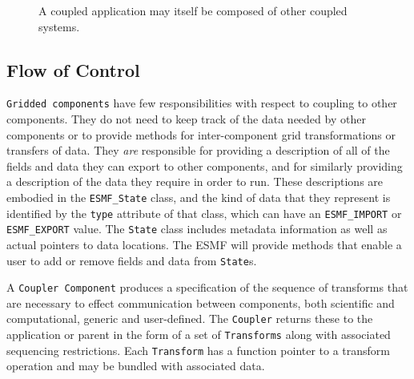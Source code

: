 \begin{figure}
\caption[{Scoping of Components in a Coupled Application}]{A coupled
application may itself be composed of other coupled systems.}
\label{fig:couplerscaling}
\end{figure}

\subsection{Flow of Control}
\label{sec:controlflow}
{\tt Gridded components} have few responsibilities with respect to coupling
to other components.  They do not need to keep track of the data needed
by other components or to provide methods for inter-component 
grid transformations or transfers of data.  They {\it are} responsible for 
providing a description of all of the fields and data they
can export to other components, and for similarly providing a description 
of the data they require in order to run.  These descriptions are
embodied in the {\tt ESMF\_State} class, and the kind of data that they 
represent is identified by the {\tt type} attribute of that class, which can
have an {\tt ESMF\_IMPORT} or {\tt ESMF\_EXPORT} value.  The {\tt State} class
includes metadata information as well as actual pointers to data 
locations.  The ESMF will provide methods that enable a user to add or
remove fields and data from {\tt State}s.  

A {\tt Coupler Component} produces a specification of the sequence of 
transforms that are necessary to effect communication between components, 
both scientific and computational, generic and user-defined.  The {\tt Coupler} 
returns these to the application or parent in the form of a set of {\tt Transforms} 
along with associated sequencing restrictions.  Each {\tt Transform} has a
function pointer to a transform operation and may be bundled with 
associated data.

